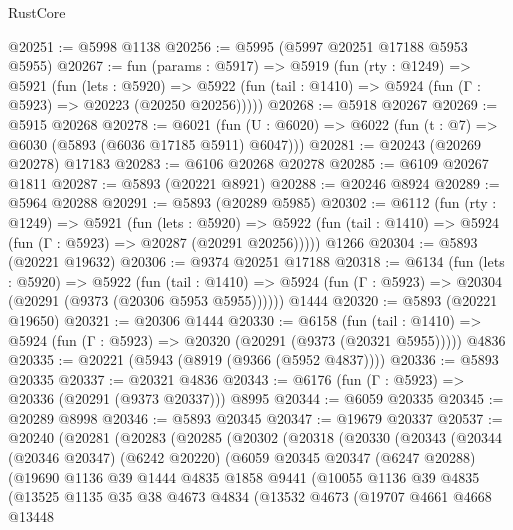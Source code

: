 \begin{lexlean}{RustCore}
\begin{coremodule}
@20251 := @5998 @1138
@20256 := @5995 (@5997 @20251 @17188 @5953 @5955)
@20267 := fun (params : @5917) =>
  @5919
    (fun (rty : @1249) =>
    @5921
      (fun (lets : @5920) =>
      @5922 (fun (tail : @1410) => @5924 (fun (Γ : @5923) => @20223 (@20250 @20256)))))
@20268 := @5918 @20267
@20269 := @5915 @20268
@20278 := @6021
    (fun (U : @6020) => @6022 (fun (t : @7) => @6030 (@5893 (@6036 @17185 @5911) @6047)))
@20281 := @20243 (@20269 @20278) @17183
@20283 := @6106 @20268 @20278
@20285 := @6109 @20267 @1811
@20287 := @5893 (@20221 @8921)
@20288 := @20246 @8924
@20289 := @5964 @20288
@20291 := @5893 (@20289 @5985)
@20302 := @6112
    (fun (rty : @1249) =>
    @5921
      (fun (lets : @5920) =>
      @5922 (fun (tail : @1410) => @5924 (fun (Γ : @5923) => @20287 (@20291 @20256)))))
    @1266
@20304 := @5893 (@20221 @19632)
@20306 := @9374 @20251 @17188
@20318 := @6134
    (fun (lets : @5920) =>
    @5922
      (fun (tail : @1410) =>
      @5924 (fun (Γ : @5923) => @20304 (@20291 (@9373 (@20306 @5953 @5955))))))
    @1444
@20320 := @5893 (@20221 @19650)
@20321 := @20306 @1444
@20330 := @6158
    (fun (tail : @1410) => @5924 (fun (Γ : @5923) => @20320 (@20291 (@9373 (@20321 @5955)))))
    @4836
@20335 := @20221 (@5943 (@8919 (@9366 (@5952 @4837))))
@20336 := @5893 @20335
@20337 := @20321 @4836
@20343 := @6176 (fun (Γ : @5923) => @20336 (@20291 (@9373 @20337))) @8995
@20344 := @6059 @20335
@20345 := @20289 @8998
@20346 := @5893 @20345
@20347 := @19679 @20337
@20537 := @20240
    (@20281
      (@20283
        (@20285
          (@20302
            (@20318
              (@20330
                (@20343
                  (@20344
                    (@20346 @20347)
                    (@6242 @20220)
                    (@6059
                      @20345
                      @20347
                      (@6247 @20288)
                      (@19690
                        @1136
                        @39
                        @1444
                        @4835
                        @1858
                        @9441
                        (@10055
                          @1136
                          @39
                          @4835
                          (@13525
                            @1135
                            @35
                            @38
                            @4673
                            @4834
                            (@13532
                              @4673
                              (@19707
                                @4661
                                @4668
                                @13448

\end{coremodule}
\end{lexlean}
